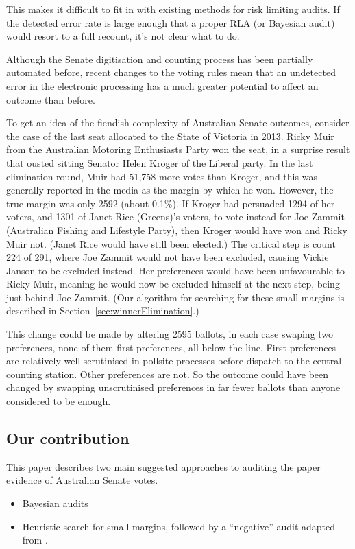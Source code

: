 \documentclass[10pt,a4paper]{article}
\begin{document}
This makes it difficult to fit in with existing methods for risk limiting audits. If the detected error rate is large enough
that a proper RLA (or Bayesian audit) would resort to a full recount, it's not clear what to do.  

Although the Senate digitisation and counting process has been partially automated before, recent changes to the voting rules mean that an undetected error in the electronic processing has a much greater potential to affect an outcome than before.

To get an idea of the fiendish complexity of Australian Senate outcomes, consider the case of the last seat allocated to the State of Victoria in 2013.  Ricky Muir from the Australian Motoring Enthusiasts Party won the seat, in a surprise result that ousted sitting Senator 
Helen Kroger of the Liberal party.  In the last elimination round, Muir had 51,758 more votes than Kroger, and this was generally reported in the media as the margin by which he won.  However, the true margin was only 2592 (about 0.1\%).  
If Kroger had persuaded 1294 of her voters, and 1301 of Janet Rice (Greens)’s voters, to  vote instead for Joe Zammit (Australian Fishing and Lifestyle Party), then Kroger would have won and Ricky Muir not. (Janet Rice would have still been elected.)  The critical step is count 224 of 291, where Joe Zammit would not have been excluded, causing Vickie Janson to be excluded instead. Her preferences would have been unfavourable to Ricky Muir, meaning he would now be excluded himself at the next step, being just behind Joe Zammit.  (Our algorithm for searching for these small margins is described in Section~\ref{sec:winnerElimination}.)

This change could be made by altering 2595 ballots, in each case swaping two preferences, none of them first preferences, all below the line.  First preferences are relatively well scrutinised in pollsite processes before dispatch to the central counting station.  Other preferences are not.   So the outcome could have been changed by swapping unscrutinised preferences in far fewer ballots than anyone considered to be enough.  

\subsection{Our contribution}
This paper describes two main suggested approaches to auditing the paper evidence of Australian Senate votes.  
\begin{itemize}
	\item Bayesian audits~\cite{rivest2012bayesian} 
	\item Heuristic search for small margins, followed by a ``negative'' audit adapted from \cite{stark2014verifiable}.
\end{itemize}
\end{document}
